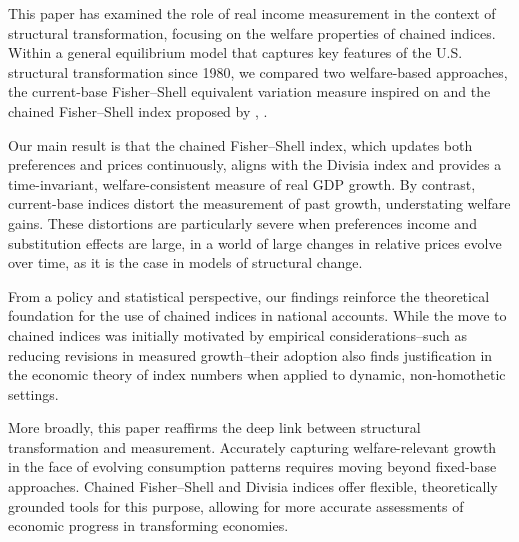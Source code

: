 \documentclass[12pt,a4paper]{article}
\begin{document}
This paper has examined the role of real income measurement in the context of structural transformation, focusing on the welfare properties of chained indices.  
Within a general equilibrium model that captures key features of the U.S. structural transformation since 1980, we compared two welfare-based approaches, the current-base Fisher--Shell equivalent variation measure inspired on \cite{BB2023welfare} and the chained Fisher--Shell index proposed by \cite{duran_licandro_2024}, .

Our main result is that the chained Fisher--Shell index, which updates both preferences and prices continuously, aligns with the Divisia index and provides a time-invariant, welfare-consistent measure of real GDP growth.  
By contrast, current-base indices distort the measurement of past growth, understating welfare gains.  
These distortions are particularly severe when preferences income and substitution effects are large, in a world of large changes in relative prices evolve over time, as it is the case in models of structural change.

From a policy and statistical perspective, our findings reinforce the theoretical foundation for the use of chained indices in national accounts.  
While the move to chained indices was initially motivated by empirical considerations--such as reducing revisions in measured growth--their adoption also finds justification in the economic theory of index numbers when applied to dynamic, non-homothetic settings.

More broadly, this paper reaffirms the deep link between structural transformation and measurement.  
Accurately capturing welfare-relevant growth in the face of evolving consumption patterns requires moving beyond fixed-base approaches.  
Chained Fisher--Shell and Divisia indices offer flexible, theoretically grounded tools for this purpose, allowing for more accurate assessments of economic progress in transforming economies.


\end{document}
